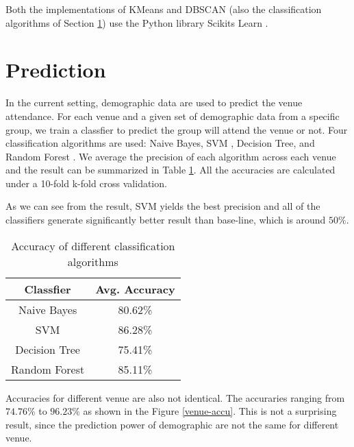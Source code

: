 \documentclass[12pt]{article}
\begin{document}
Both the implementations of KMeans and DBSCAN (also the classification algorithms of Section \ref{prediction}) use the Python library Scikits Learn \cite{sklearn}.

\section{Prediction}\label{prediction}

In the current setting, demographic data are used to predict the venue attendance. For each venue and a given set of demographic data from a specific group, we train a classfier to predict the group will attend the venue or not. Four classification algorithms are used: Naive Bayes, SVM \cite{Cortes95}, Decision Tree, and Random Forest \cite{Breiman01}. We average the precision of each algorithm across each venue and the result can be summarized in Table \ref{class-accu}. All the accuracies are calculated under a 10-fold k-fold cross validation.

As we can see from the result, SVM yields the best precision and all of the classifiers generate significantly better result than base-line, which is around $50\%$. 

\begin{table}
\begin{center}
    \begin{tabular}{ | c | c | }
        \hline
        \textbf {Classfier} & \textbf{Avg. Accuracy} \\ \hline
        \hline
        Naive Bayes     & 80.62\% \\ \hline
        SVM             & 86.28\% \\ \hline
        Decision Tree   & 75.41\% \\ \hline
        Random Forest   & 85.11\% \\ \hline
    \end{tabular}
\caption{Accuracy of different classification algorithms}
\label{class-accu}
\end{center}
\end{table}

Accuracies for different venue are also not identical. The accuraries ranging from $74.76\%$ to $96.23\%$ as shown in the Figure \ref{venue-accu}. This is not a surprising result, since the prediction power of demographic are not the same for different venue.
\end{document}
